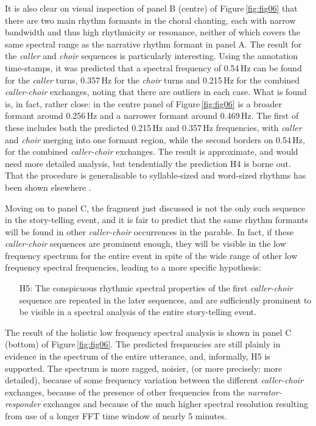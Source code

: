\documentclass[output=paper,colorlinks,citecolor=brown
]{langscibook}
\begin{document}
It is also clear on visual inspection of panel B (centre) of Figure\,\ref{fig:fig06} that there are two main rhythm formants in the choral chanting, each with narrow bandwidth and thus high rhythmicity or resonance, neither of which covers the same spectral range as the narrative rhythm formant in panel A. The result for the \textit{caller} and \textit{choir} sequences is particularly interesting. Using the annotation time-stamps, it was predicted that a spectral frequency of 0.54\,Hz can be found for the \textit{caller} turns, 0.357\,Hz for the \textit{choir} turns and 0.215\,Hz for the combined \textit{caller-choir} exchanges, noting that there are outliers in each case. What is found is, in fact, rather close: in the centre panel of Figure\,\ref{fig:fig06} is a broader formant around 0.256\,Hz and a narrower formant around 0.469\,Hz. The first of these includes both the predicted 0.215\,Hz and 0.357\,Hz frequencies, with \textit{caller} and \textit{choir} merging into one formant region, while the second borders on 0.54\,Hz, for the combined \textit{caller-choir} exchanges. The result is approximate, and would need more detailed analysis, but tendentially the prediction H4 is borne out. That the procedure is generalisable to syllable-sized and word-sized rhythms has been shown elsewhere \cite{gibbonjipa2021}.

Moving on to panel C, the fragment just discussed is not the only such sequence in the story-telling event, and it is fair to predict that the same rhythm formants will be found in other \textit{caller-choir} occurrences in the parable. In fact, if these \textit{caller-choir} sequences are prominent enough, they will be visible in the low frequency spectrum for the entire event in spite of the wide range of other low frequency spectral frequencies, leading to a more specific hypothesis:

\vspace{-5pt}
\begin{itemize} \itemsep -5pt
    \item[H5:] The conspicuous rhythmic spectral properties of the first \textit{caller-choir} sequence are repeated in the later sequences, and are sufficiently prominent to be visible in a spectral analysis of the entire story-telling event.
\end{itemize}

The result of the holistic low frequency spectral analysis is shown in panel C (bottom) of Figure\,\ref{fig:fig06}. The predicted frequencies are still plainly in evidence in the spectrum of the entire utterance, and, informally, H5 is supported. The spectrum is more ragged, noisier, (or more precisely: more detailed), because of some frequency variation between the different \textit{caller-choir} exchanges, because of the presence of other frequencies from the \textit{narrator-responder} exchanges and because of the much higher spectral resolution resulting from use of a longer FFT time window of nearly 5 minutes.
\end{document}
